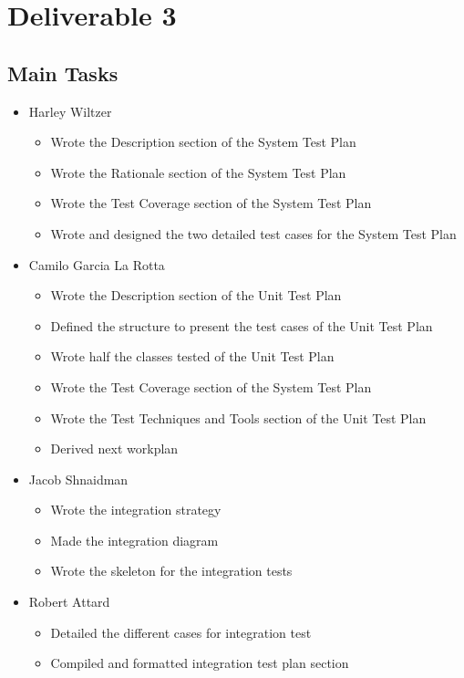 \documentclass[12pt]{article}
\begin{document}
\newpage
 \section{Deliverable 3}
%
 \subsection{Main Tasks}
%
%
 \begin{itemize}
     \item Harley Wiltzer
 	\begin{itemize}
 		\item Wrote the Description section of the System Test Plan
		\item Wrote the Rationale section of the System Test Plan
		\item Wrote the Test Coverage section of the System Test Plan
		\item Wrote and designed the two detailed test cases for the System Test Plan
 	\end{itemize}
     \item Camilo Garcia La Rotta
     \begin{itemize}
        \item Wrote the Description section of the Unit Test Plan
		\item Defined the structure to present the test cases of the Unit Test Plan
		\item Wrote half the classes tested of the Unit Test Plan
		\item Wrote the Test Coverage section of the System Test Plan
		\item Wrote the Test Techniques and Tools section of the Unit Test Plan
		\item Derived next workplan
     \end{itemize}
     \item Jacob Shnaidman
 		\begin{itemize}
 			\item Wrote the integration strategy
			\item Made the integration diagram
			\item Wrote the skeleton for the integration tests
 		\end{itemize}
     \item Robert Attard
     \begin{itemize}
         \item Detailed the different cases for integration test
         \item Compiled and formatted integration test plan section

\end{itemize}
\end{itemize}
\end{document}
